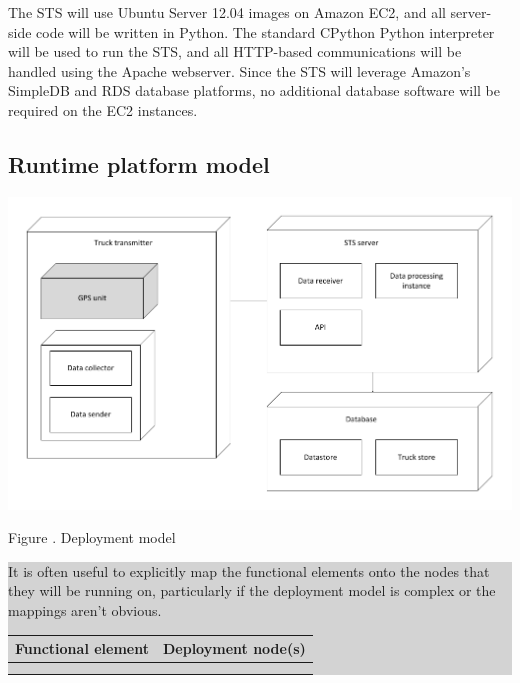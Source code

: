 \documentclass[a4paper,11pt]{report}
\newcommand{\instructions}[1]{
  \noindent\colorbox{lightgray}{%
    \parbox{\linewidth}{%
      #1
    }%
  }%
 \vspace{0.1cm}
}
\newcommand{\mycaption}[1]{
  \addtocounter{figures}{1}
  Figure \arabic{figures}. #1
}
\begin{document}
The STS will use Ubuntu Server 12.04 images on Amazon EC2, and all server-side
code will be written in Python. The standard CPython Python interpreter will be
used to run the STS, and all HTTP-based communications will be handled using the
Apache webserver. Since the STS will leverage Amazon's SimpleDB and RDS database
platforms, no additional database software will be required on the EC2
instances.

\subsection{Runtime platform model}
\label{sec:runt-platf-model}


\begin{center}
  \includegraphics[width=\textwidth]{figures/Runtime_platform_model}\\
  \mycaption{Deployment model}
\end{center}

\instructions{
It is often useful to explicitly map the functional elements onto the
nodes that they will be running on, particularly if the deployment
model is complex or the mappings aren’t obvious.

\begin{center}
  \begin{tabular}[h!]{| p{0.4\textwidth} | p{0.5\textwidth} |}
    \hline
    \rowcolor{gray}
    Functional element & Deployment node(s) \\
    \hline
    \hline
    & \\
    \hline
    & \\
    \hline
  \end{tabular}
\end{center}

}
\end{document}
